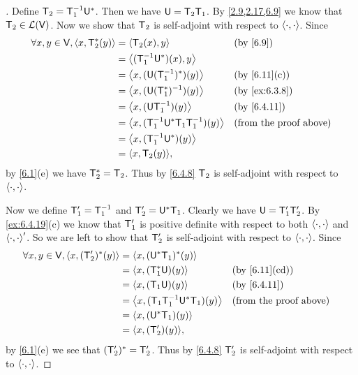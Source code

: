\begin{proof}[]
	Define \(\mathsf{T}_2 = \mathsf{T}_1^{-1} \mathsf{U}^*\).
	Then we have \(\mathsf{U} = \mathsf{T}_2 \mathsf{T}_1\).
	By \cref{2.9,2.17,6.9} we know that \(\mathsf{T}_2 \in \mathcal{L}(\mathsf{V})\).
	Now we show that \(\mathsf{T}_2\) is self-adjoint with respect to \(\left\langle\cdot, \cdot\right\rangle\).
	Since
	\begin{align*}
		\forall x, y \in \V, \inn{x, \T_2^*(y)} & = \inn{\T_2(x), y}                            &  & \by{6.9}                      \\
		                                        & = \inn{(\T_1^{-1} \U^*)(x), y}                                                   \\
		                                        & = \inn{x, (\U (\T_1^{-1})^*)(y)}              &  & \by{6.11}[c]                  \\
		                                        & = \inn{x, (\U (\T_1^*)^{-1})(y)}              &  & \by{ex:6.3.8}                 \\
		                                        & = \inn{x, (\U \T_1^{-1})(y)}                  &  & \by{6.4.11}                   \\
		                                        & = \inn{x, (\T_1^{-1} \U^* \T_1 \T_1^{-1})(y)} &  & \text{(from the proof above)} \\
		                                        & = \inn{x, (\T_1^{-1} \U^*)(y)}                                                   \\
		                                        & = \inn{x, \T_2(y)},
	\end{align*}
	by \cref{6.1}(e) we have \(\mathsf{T}_2^* = \mathsf{T}_2\).
	Thus by \cref{6.4.8} \(\mathsf{T}_2\) is self-adjoint with respect to \(\left\langle\cdot, \cdot\right\rangle\).

	Now we define \(\mathsf{T}_1' = \mathsf{T}_1^{-1}\) and \(\mathsf{T}_2' = \mathsf{U}^* \mathsf{T}_1\).
	Clearly we have \(\mathsf{U} = \mathsf{T}_1' \mathsf{T}_2'\).
	By \cref{ex:6.4.19}(c) we know that \(\mathsf{T}_1'\) is positive definite with respect to both \(\left\langle\cdot, \cdot\right\rangle\) and \(\left\langle\cdot, \cdot\right\rangle'\).
	So we are left to show that \(\mathsf{T}_2'\) is self-adjoint with respect to \(\left\langle\cdot, \cdot\right\rangle\).
	Since
	\begin{align*}
		\forall x, y \in \V, \inn{x, (\T_2')^*(y)} & = \inn{x, (\U^* \T_1)^*(y)}                                                 \\
		                                           & = \inn{x, (\T_1^* \U)(y)}                &  & \by{6.11}[cd]                 \\
		                                           & = \inn{x, (\T_1 \U)(y)}                  &  & \by{6.4.11}                   \\
		                                           & = \inn{x, (\T_1 \T_1^{-1} \U^* \T_1)(y)} &  & \text{(from the proof above)} \\
		                                           & = \inn{x, (\U^* \T_1)(y)}                                                   \\
		                                           & = \inn{x, (\T_2')(y)},
	\end{align*}
	by \cref{6.1}(e) we see that \((\mathsf{T}_2')^* = \mathsf{T}_2'\).
	Thus by \cref{6.4.8} \(\mathsf{T}_2'\) is self-adjoint with respect to \(\left\langle\cdot, \cdot\right\rangle\).
\end{proof}

